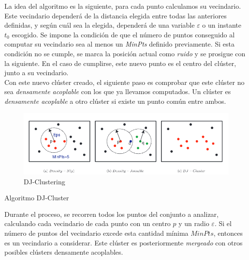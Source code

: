 \documentclass[a4paper, 12pt]{article}
\begin{document}
La idea del algoritmo es la siguiente, para cada punto calculamos su vecindario. Este vecindario depender\'a de la distancia elegida entre todas las anteriores definidas, y seg\'un cu\'al sea la elegida, depender\'a de una variable $\varepsilon$ o un instante $t_0$ escogido. Se impone la condici\'on de que el n\'umero de puntos conseguido al computar su vecindario sea al menos un \textit{MinPts} definido previamente. Si esta condici\'on no se cumple, se marca la posici\'on actual como \textit{ruido} y se prosigue con la siguiente. En el caso de cumplirse, este nuevo punto es el centro del cl\'uster, junto a su vecindario.  \\

Con este nuevo cl\'uster creado, el siguiente paso es comprobar que este cl\'uster no sea \textit{densamente acoplable} con los que ya llevamos computados. Un cl\'uster es \textit{densamente acoplable} a otro cl\'uster si existe un punto com\'un entre ambos. \\

\begin{figure}[H]
\centering
	\includegraphics[scale=.7]{djcluster.png}
\caption{DJ-Clustering}
\end{figure}

\begin{algorithm}[!htbp]\label{djCluster}
\begin{algorithmic}[1]
		\Else
		\EndIf
	\EndFor
\end{algorithmic}
\caption{\label{alg:djcluster} Algoritmo DJ-Cluster}
\end{algorithm}

Durante el proceso, se recorren todos los puntos del conjunto a analizar, calculando cada vecindario de cada punto con un centro $p$ y un radio $\varepsilon$. Si el n\'umero de puntos del vecindario excede esta cantidad m\'inima $MinPts$, entonces es un vecindario a considerar. Este cl\'uster es posteriormente \textit{mergeado} con otros posibles cl\'usters densamente acoplables. \\
\end{document}
